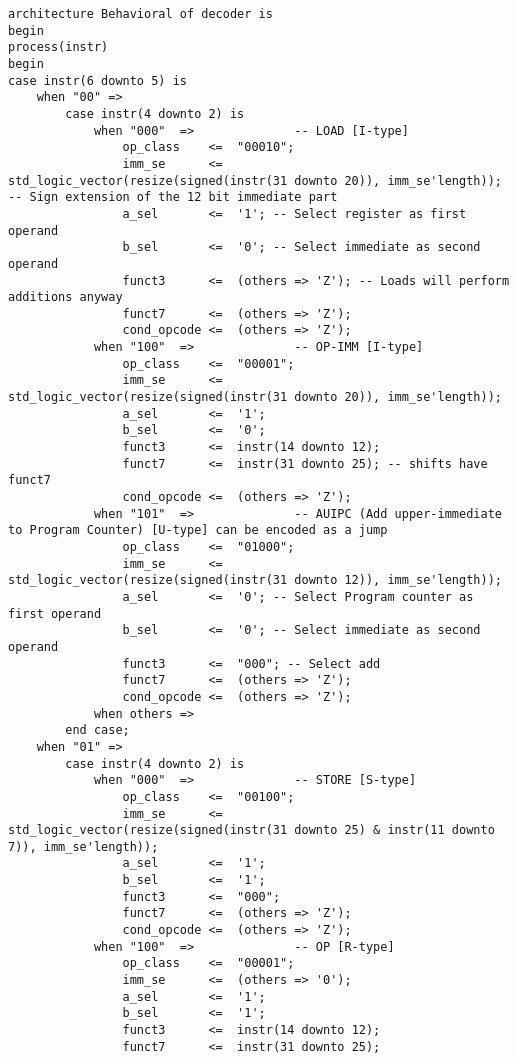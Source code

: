 \begin{code}
\begin{verbatim}
architecture Behavioral of decoder is    
begin
process(instr)
begin
case instr(6 downto 5) is
    when "00" =>
        case instr(4 downto 2) is 
            when "000"  =>              -- LOAD [I-type]
                op_class    <=  "00010";
                imm_se      <=  std_logic_vector(resize(signed(instr(31 downto 20)), imm_se'length)); -- Sign extension of the 12 bit immediate part 
                a_sel       <=  '1'; -- Select register as first operand 
                b_sel       <=  '0'; -- Select immediate as second operand
                funct3      <=  (others => 'Z'); -- Loads will perform additions anyway
                funct7      <=  (others => 'Z'); 
                cond_opcode <=  (others => 'Z');   
            when "100"  =>              -- OP-IMM [I-type]
                op_class    <=  "00001";
                imm_se      <=  std_logic_vector(resize(signed(instr(31 downto 20)), imm_se'length));
                a_sel       <=  '1';
                b_sel       <=  '0';
                funct3      <=  instr(14 downto 12);
                funct7      <=  instr(31 downto 25); -- shifts have funct7
                cond_opcode <=  (others => 'Z');    
            when "101"  =>              -- AUIPC (Add upper-immediate to Program Counter) [U-type] can be encoded as a jump
                op_class    <=  "01000";
                imm_se      <=  std_logic_vector(resize(signed(instr(31 downto 12)), imm_se'length));
                a_sel       <=  '0'; -- Select Program counter as first operand 
                b_sel       <=  '0'; -- Select immediate as second operand
                funct3      <=  "000"; -- Select add
                funct7      <=  (others => 'Z');  
                cond_opcode <=  (others => 'Z');                         
            when others =>
        end case;
    when "01" =>
        case instr(4 downto 2) is 
            when "000"  =>              -- STORE [S-type]
                op_class    <=  "00100";
                imm_se      <=  std_logic_vector(resize(signed(instr(31 downto 25) & instr(11 downto 7)), imm_se'length));
                a_sel       <=  '1';
                b_sel       <=  '1';
                funct3      <=  "000";
                funct7      <=  (others => 'Z'); 
                cond_opcode <=  (others => 'Z'); 
            when "100"  =>              -- OP [R-type]
                op_class    <=  "00001";
                imm_se      <=  (others => '0');
                a_sel       <=  '1';
                b_sel       <=  '1';
                funct3      <=  instr(14 downto 12);
                funct7      <=  instr(31 downto 25);

\end{verbatim}
\end{code}
